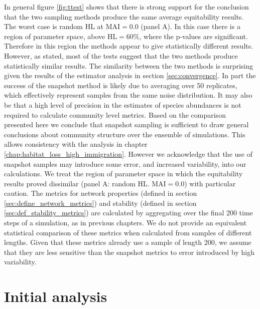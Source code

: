 In general figure \ref{fig:ttest} shows that there is strong support for the conclusion that the two sampling methods produce the same average equitability results. The worst case is random HL at MAI$=0.0$ (panel A). In this case there is a region of parameter space, above HL$=60\%$, where the p-values are significant. Therefore in this region the methods appear to give statistically different results. However, as stated, most of the tests suggest that the two methods produce statistically similar results. The similarity between the two methods is surprising given the results of the estimator analysis in section \ref{sec:convergence}. In part the success of the snapshot method is likely due to averaging over 50 replicates, which effectively represent samples from the same noise distribution. It may also be that a high level of precision in the estimates of species abundances is not required to calculate community level metrics. Based on the comparison presented here we conclude that snapshot sampling is sufficient to draw general conclusions about community structure over the ensemble of simulations. This allows consistency with the analysis in chapter \ref{chap:habitat_loss_high_immigration}. However we acknowledge that the use of snapshot samples may introduce some error, and increased variability, into our calculations. We treat the region of parameter space in which the equitability results proved dissimilar (panel A: random HL. MAI$=0.0$) with particular caution. The metrics for network properties (defined in section \ref{sec:define_network_metrics}) and stability (defined in section \ref{sec:def_stability_metrics}) are calculated by aggregating over the final 200 time steps of a simulation, as in previous chapters. We do not provide an equivalent statistical comparison of these metrics when calculated from samples of different lengths. Given that these metrics already use a sample of length 200, we assume that they are less sensitive than the snapshot metrics to error introduced by high variability.   

\section{Initial analysis}
\label{sec:init_res}


